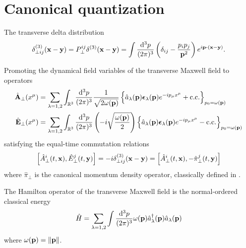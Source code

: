 \section{Canonical quantization}

\begin{definition}\label{def:delta_distribution_transverse}
	The transverse delta distribution
	\begin{equation}
		\label{eq:delta_distribution_transverse}
		\delta_{\perp ij}^{(3)}(\vb{x}-\vb{y})
		=
		P^{ij}_\perp
		\delta^{(3)}(\vb{x}-\vb{y})
		=
		\int\frac{\dd[3]{p}}{(2\pi)^3}
		\left(
			\delta_{ij}
			-
			\frac{p_ip_j}{\vb{p}^2}
		\right)
		e^{i\vb{p}\vdot(\vb{x}-\vb{y})}
		.
	\end{equation}
\end{definition}
\begin{corollary}\label{thm:qmw_transverse}
	Promoting the dynamical field variables of the transverse Maxwell field to operators
	\begin{align}
		\label{eq:qmw_transverse}
		\hat{\vb{A}}_\perp(x^\mu)
		&=
		\sum_{\lambda=1,2}
		\int_{\mathbb{R}^3}\frac{\dd[3]{p}}{(2\pi)^3}
		\frac{1}{\sqrt{2\omega(\vb{p})}}
		\left\{
			\hat{a}_\lambda(\vb{p})
			\boldsymbol{\epsilon}_\lambda(\vb{p})
			e^{-ip_\mu x^\mu}
			+
			\text{c.c.}
		\right\}_{p_0=\omega(\vb{p})}
		\\
		\hat{\vb{E}}_\perp(x^\mu)
		&=
		\sum_{\lambda=1,2}
		\int_{\mathbb{R}^3}\frac{\dd[3]{p}}{(2\pi)^3}
		\left(
			-i
			\sqrt{\frac{\omega(\vb{p})}{2}}
		\right)
		\left\{
			\hat{a}_\lambda(\vb{p})
			\boldsymbol{\epsilon}_\lambda(\vb{p})
			e^{-ip_\mu x^\mu}
			-
			\text{c.c.}
		\right\}_{p_0=\omega(\vb{p})}
	\end{align}
	satisfying the equal-time commutation relations~\cite[p.~197]{Greiner2013}
	\begin{equation}
		\label{eq:qmw_transverse_comm}
		\comm{\hat{A}_\perp^i(t,\vb{x})}{\hat{E}_\perp^j(t,\vb{y})}
		=
		-i
		\delta_{\perp ij}^{(3)}(\vb{x}-\vb{y})
		=
		\comm{\hat{A}_\perp^i(t,\vb{x})}{-\hat\pi_\perp^j(t,\vb{y})}
	\end{equation}
	where $\hat\pi_\perp$ is the canonical momentum density operator, classically defined in .
\end{corollary}
\begin{definition}\label{thm:qmw_hamilton}
	The Hamilton operator of the transverse Maxwell field is the normal-ordered classical energy
	\begin{equation}
		\label{eq:qmw_hamilton}
		\hat{H}
		=
		\sum_{\lambda=1,2}
		\int\frac{\dd[3]{p}}{(2\pi)^3}
		\omega(\vb{p})
		\hat{a}_\lambda^\dagger(\vb{p})
		\hat{a}_\lambda(\vb{p})
	\end{equation}
	where $\omega(\vb{p})=\norm{\vb{p}}$.
\end{definition}
